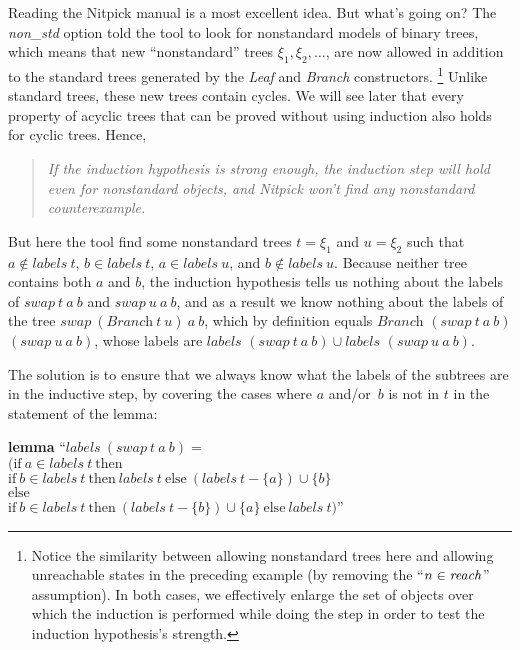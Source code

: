 \documentclass[a4paper,12pt]{article}
\begin{document}
Reading the Nitpick manual is a most excellent idea.
But what's going on? The \textit{non\_std} option told the tool to look for
nonstandard models of binary trees, which means that new ``nonstandard'' trees
$\xi_1, \xi_2, \ldots$, are now allowed in addition to the standard trees
generated by the \textit{Leaf} and \textit{Branch} constructors.%
\footnote{Notice the similarity between allowing nonstandard trees here and
allowing unreachable states in the preceding example (by removing the ``$n \in
\textit{reach\/}$'' assumption). In both cases, we effectively enlarge the
set of objects over which the induction is performed while doing the step
in order to test the induction hypothesis's strength.}
Unlike standard trees, these new trees contain cycles. We will see later that
every property of acyclic trees that can be proved without using induction also
holds for cyclic trees. Hence,
%
\begin{quote}
\textsl{If the induction
hypothesis is strong enough, the induction step will hold even for nonstandard
objects, and Nitpick won't find any nonstandard counterexample.}
\end{quote}
%
But here the tool find some nonstandard trees $t = \xi_1$
and $u = \xi_2$ such that $a \notin \textit{labels}~t$, $b \in
\textit{labels}~t$, $a \in \textit{labels}~u$, and $b \notin \textit{labels}~u$.
Because neither tree contains both $a$ and $b$, the induction hypothesis tells
us nothing about the labels of $\textit{swap}~t~a~b$ and $\textit{swap}~u~a~b$,
and as a result we know nothing about the labels of the tree
$\textit{swap}~(\textit{Branch}~t~u)~a~b$, which by definition equals
$\textit{Branch}$ $(\textit{swap}~t~a~b)$ $(\textit{swap}~u~a~b)$, whose
labels are $\textit{labels}$ $(\textit{swap}~t~a~b) \mathrel{\cup}
\textit{labels}$ $(\textit{swap}~u~a~b)$.

The solution is to ensure that we always know what the labels of the subtrees
are in the inductive step, by covering the cases where $a$ and/or~$b$ is not in
$t$ in the statement of the lemma:

\prew
\textbf{lemma} ``$\textit{labels}~(\textit{swap}~t~a~b) = {}$ \\
$(\textrm{if}~a \in \textit{labels}~t~\textrm{then}$ \nopagebreak \\
$\textrm{if}~b \in \textit{labels}~t~\textrm{then}~\textit{labels}~t~\textrm{else}~(\textit{labels}~t - \{a\}) \mathrel{\cup} \{b\}$ \\
$\textrm{else}$ \\
$\textrm{if}~b \in \textit{labels}~t~\textrm{then}~(\textit{labels}~t - \{b\}) \mathrel{\cup} \{a\}~\textrm{else}~\textit{labels}~t)$''
\postw
\end{document}
